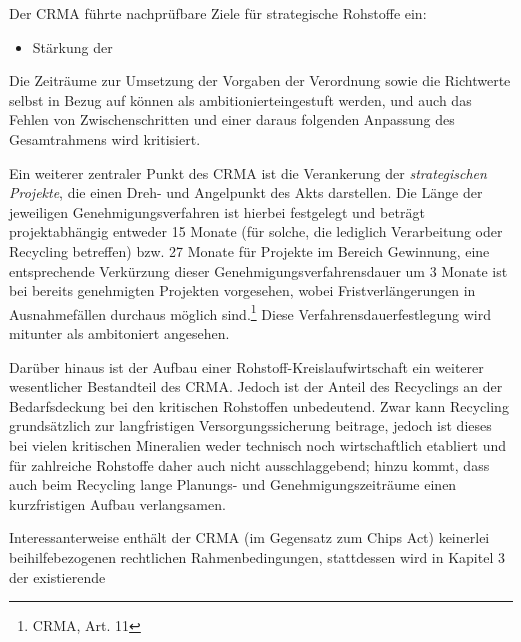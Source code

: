 \documentclass[12pt,a4paper,oneside]{book} %
\begin{document}
Der CRMA führte nachprüfbare Ziele für strategische Rohstoffe ein:
\begin{itemize}
	\item Stärkung der 
\end{itemize}

Die Zeiträume zur Umsetzung der Vorgaben der Verordnung sowie die Richtwerte selbst in Bezug auf können als \glq ambitioniert\grqq eingestuft werden, und auch das Fehlen von Zwischenschritten und einer daraus folgenden Anpassung des Gesamtrahmens wird kritisiert.\autocite{Frenz 2025, S. 1099}

Ein weiterer zentraler Punkt des CRMA ist die Verankerung der \textit{strategischen Projekte}, die einen Dreh- und Angelpunkt des Akts darstellen.
Die Länge der jeweiligen Genehmigungsverfahren ist hierbei festgelegt und beträgt projektabhängig entweder 15 Monate (für solche, die lediglich Verarbeitung oder Recycling betreffen) bzw. 27 Monate für Projekte im Bereich Gewinnung, eine entsprechende Verkürzung dieser Genehmigungsverfahrensdauer um 3 Monate ist bei bereits genehmigten Projekten vorgesehen, wobei Fristverlängerungen in Ausnahmefällen durchaus möglich sind.\footnote{CRMA, Art. 11} Diese Verfahrensdauerfestlegung wird mitunter als ambitoniert angesehen.\autocite{Quantz, ZfPC 2024, 1}


Darüber hinaus ist der Aufbau einer Rohstoff-Kreislaufwirtschaft ein weiterer wesentlicher Bestandteil des CRMA. Jedoch ist der Anteil des Recyclings an der Bedarfsdeckung bei den kritischen Rohstoffen unbedeutend.\autocite{Bericht zur Rohstoffsituation in Deutschland 2023} Zwar kann Recycling grundsätzlich zur langfristigen Versorgungssicherung beitrage, jedoch ist dieses bei vielen kritischen Mineralien weder technisch noch wirtschaftlich etabliert und für zahlreiche Rohstoffe daher auch nicht ausschlaggebend; hinzu kommt, dass auch beim Recycling lange Planungs- und Genehmigungszeiträume einen kurzfristigen Aufbau verlangsamen.\autocite{IW-Trends_2026-2-6_Neligan_et_al_Rohstoffe, S. 101}


Interessanterweise enthält der CRMA (im Gegensatz zum Chips Act) keinerlei beihilfebezogenen rechtlichen Rahmenbedingungen, stattdessen wird in Kapitel 3 der existierende 
\end{document}
